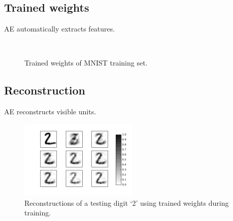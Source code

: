 \documentclass[conference]{IEEEtran}
\begin{document}
\subsection{Trained weights}
AE automatically extracts features.
	\begin{figure}
		\\
		\caption{Trained weights of MNIST training set.}
	\end{figure}
	
\subsection{Reconstruction}
AE reconstructs visible units.
	\begin{figure}
		\centering
		\includegraphics[width=0.5\textwidth]{recon_digit}
		\caption{Reconstructions of a testing digit `2' using trained weights during training.}
		\label{fig:recon}		
	\end{figure}
\end{document}
